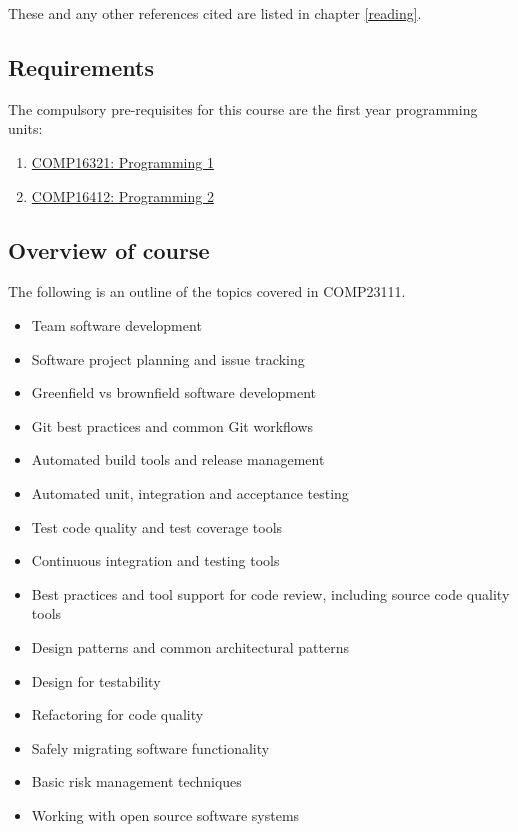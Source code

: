 \documentclass[
]{book}
\providecommand{\tightlist}{%
  \setlength{\itemsep}{0pt}\setlength{\parskip}{0pt}}
\begin{document}
These and any other references cited are listed in chapter \ref{reading}.

\hypertarget{prereq}{%
\subsection{Requirements}\label{prereq}}

The compulsory pre-requisites for this course are the first year programming units:

\begin{enumerate}
\def\labelenumi{\arabic{enumi}.}
\tightlist
\item
  \href{https://studentnet.cs.manchester.ac.uk/ugt/COMP16321/syllabus/}{COMP16321: Programming 1}
\item
  \href{https://studentnet.cs.manchester.ac.uk/ugt/COMP16412/syllabus/}{COMP16412: Programming 2}
\end{enumerate}

\hypertarget{courseo}{%
\subsection{Overview of course}\label{courseo}}

The following is an outline of the topics covered in COMP23111.

\begin{itemize}
\tightlist
\item
  Team software development
\item
  Software project planning and issue tracking
\item
  Greenfield vs brownfield software development
\item
  Git best practices and common Git workflows
\item
  Automated build tools and release management
\item
  Automated unit, integration and acceptance testing
\item
  Test code quality and test coverage tools
\item
  Continuous integration and testing tools
\item
  Best practices and tool support for code review, including source code quality tools
\item
  Design patterns and common architectural patterns
\item
  Design for testability
\item
  Refactoring for code quality
\item
  Safely migrating software functionality
\item
  Basic risk management techniques
\item
  Working with open source software systems
\end{itemize}
\end{document}
